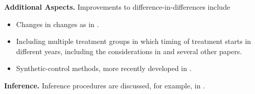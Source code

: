 \noindent \textbf{Additional Aspects.} Improvements to difference-in-differences include
\begin{itemize}
	\item Changes in changes as in \citet{athey_identification_2006}. 
	\item Including multiple treatment groups in which timing of treatment starts in different years, including the considerations in \citet{goodman-bacon_difference--differences_2018} and several other papers.
	\item Synthetic-control methods, more recently developed in \citet{kellogg_combining_2020}. 
\end{itemize}
\noindent \textbf{Inference.} Inference procedures are discussed, for example, in \citet{bertrand_how_2004}. 

\singlespacing





